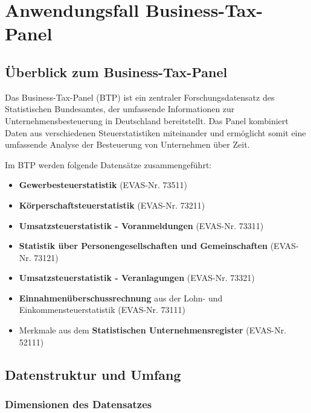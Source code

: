 \documentclass[
  ngerman,
  10pt,
  letterpaper,
  twocolumn]{book}
\providecommand{\tightlist}{%
  \setlength{\itemsep}{0pt}\setlength{\parskip}{0pt}}
\begin{document}

\chapter{Anwendungsfall Business-Tax-Panel}\label{sec-btp}

\section{Überblick zum
Business-Tax-Panel}\label{uxfcberblick-zum-business-tax-panel}

Das Business-Tax-Panel (BTP) ist ein zentraler Forschungsdatensatz des
Statistischen Bundesamtes, der umfassende Informationen zur
Unternehmensbesteuerung in Deutschland bereitstellt. Das Panel
kombiniert Daten aus verschiedenen Steuerstatistiken miteinander und
ermöglicht somit eine umfassende Analyse der Besteuerung von Unternehmen
über Zeit.

Im BTP werden folgende Datensätze zusammengeführt:

\begin{itemize}
\tightlist
\item
  \textbf{Gewerbesteuerstatistik} (EVAS-Nr. 73511)
\item
  \textbf{Körperschaftsteuerstatistik} (EVAS-Nr. 73211)
\item
  \textbf{Umsatzsteuerstatistik - Voranmeldungen} (EVAS-Nr. 73311)
\item
  \textbf{Statistik über Personengesellschaften und Gemeinschaften}
  (EVAS-Nr. 73121)
\item
  \textbf{Umsatzsteuerstatistik - Veranlagungen} (EVAS-Nr. 73321)
\item
  \textbf{Einnahmenüberschussrechnung} aus der Lohn- und
  Einkommensteuerstatistik (EVAS-Nr. 73111)
\item
  Merkmale aus dem \textbf{Statistischen Unternehmensregister} (EVAS-Nr.
  52111)
\end{itemize}

\section{Datenstruktur und Umfang}\label{datenstruktur-und-umfang}

\subsection{Dimensionen des
Datensatzes}\label{dimensionen-des-datensatzes}
\end{document}
